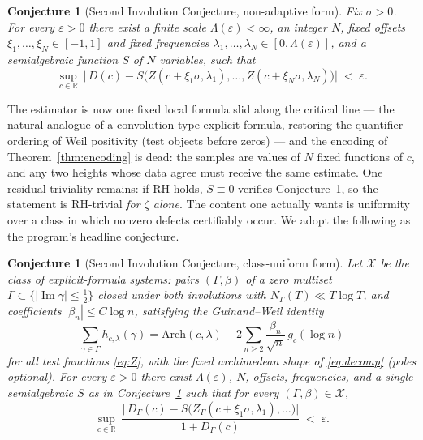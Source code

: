 \documentclass[11pt]{amsart}
\theoremstyle{plain}
\newtheorem{conjecture}[theorem]{Conjecture}
\theoremstyle{definition}
\theoremstyle{remark}
\newcommand{\RR}{\mathbb{R}}
\newcommand{\im}{\operatorname{Im}}
\begin{document}
\begin{conjecture}[Second Involution Conjecture, non-adaptive form]\label{conj:repaired}
Fix $\sigma>0$. For every $\varepsilon>0$ there exist a finite scale $\Lambda(\varepsilon)<\infty$,
an integer $N$, \emph{fixed} offsets $\xi_1,\dots,\xi_N\in[-1,1]$ and \emph{fixed} frequencies
$\lambda_1,\dots,\lambda_N\in[0,\Lambda(\varepsilon)]$, and a semialgebraic function $S$ of $N$
variables, such that
\[
\sup_{c\in\RR}\ \bigl|\,D(c)-S\bigl(Z(c+\xi_1\sigma,\lambda_1),\dots,
Z(c+\xi_N\sigma,\lambda_N)\bigr)\bigr|\;<\;\varepsilon .
\]
\end{conjecture}

The estimator is now one fixed local formula slid along the critical line --- the natural analogue
of a convolution-type explicit formula, restoring the quantifier ordering of Weil positivity (test
objects before zeros) --- and the encoding of Theorem~\ref{thm:encoding} is dead: the samples are
values of $N$ fixed functions of $c$, and any two heights whose data agree must receive the same
estimate. One residual triviality remains: if RH holds, $S\equiv0$ verifies
Conjecture~\ref{conj:repaired}, so the statement is RH-trivial \emph{for $\zeta$ alone}. The
content one actually wants is uniformity over a class in which nonzero defects certifiably occur.
We adopt the following as the program's headline conjecture.

\begin{conjecture}[Second Involution Conjecture, class-uniform form]\label{conj:uniform}
Let $\mathcal X$ be the class of \emph{explicit-formula systems}: pairs $(\Gamma,\beta)$ of a zero
multiset $\Gamma\subset\{|\im\gamma|\le\tfrac12\}$ closed under both involutions with
$N_\Gamma(T)\ll T\log T$, and coefficients $|\beta_n|\le C\log n$, satisfying the Guinand--Weil
identity
\[
\sum_{\gamma\in\Gamma}h_{c,\lambda}(\gamma)=\mathrm{Arch}(c,\lambda)
-2\sum_{n\ge2}\frac{\beta_n}{\sqrt n}\,g_c(\log n)
\]
for all test functions \eqref{eq:Z}, with the fixed archimedean shape of \eqref{eq:decomp} (poles
optional). For every $\varepsilon>0$ there exist $\Lambda(\varepsilon)$, $N$, offsets, frequencies,
and a single semialgebraic $S$ as in Conjecture~\ref{conj:repaired} such that for \emph{every}
$(\Gamma,\beta)\in\mathcal X$,
\[
\sup_{c\in\RR}\ \frac{\bigl|\,D_\Gamma(c)-S\bigl(Z_\Gamma(c+\xi_1\sigma,\lambda_1),\dots\bigr)
\bigr|}{1+D_\Gamma(c)}\;<\;\varepsilon .
\]
\end{conjecture}
\end{document}
